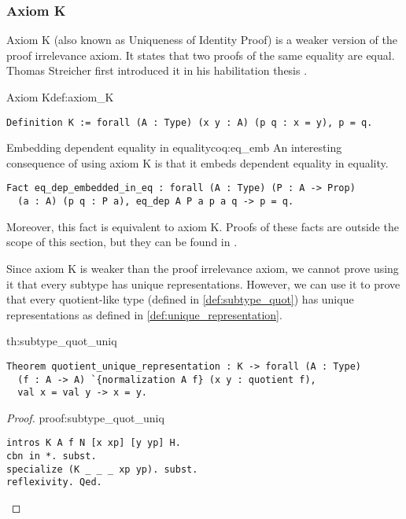 \subsubsection{Axiom K}
Axiom K (also known as Uniqueness of Identity Proof) is a weaker version of the proof irrelevance axiom. It states that two proofs of the same equality are equal. Thomas Streicher first introduced it in his habilitation thesis \cite{Streicher}.
\begin{defi}{Axiom K}{def:axiom_K}
\begin{verbatim}
Definition K := forall (A : Type) (x y : A) (p q : x = y), p = q.
\end{verbatim}
\end{defi}
\begin{coq}{Embedding dependent equality in equality}{coq:eq_emb}
An interesting consequence of using axiom K is that it embeds dependent equality in equality.
\begin{verbatim}
Fact eq_dep_embedded_in_eq : forall (A : Type) (P : A -> Prop)
  (a : A) (p q : P a), eq_dep A P a p a q -> p = q.
\end{verbatim}
Moreover, this fact is equivalent to axiom K. Proofs of these facts are outside the scope of this section, but they can be found in .
\end{coq}
Since axiom K is weaker than the proof irrelevance axiom, we cannot prove using it that every subtype has unique representations. However, we can use it to prove that every quotient-like type (defined in \ref{def:subtype_quot}) has unique representations as defined in \ref{def:unique_representation}.
\begin{theo}{}{th:subtype_quot_uniq}
\begin{verbatim}
Theorem quotient_unique_representation : K -> forall (A : Type) 
  (f : A -> A) `{normalization A f} (x y : quotient f),
  val x = val y -> x = y.
\end{verbatim}
\end{theo}
\begin{proof}{}{proof:subtype_quot_uniq}
\begin{verbatim}
intros K A f N [x xp] [y yp] H. 
cbn in *. subst. 
specialize (K _ _ _ xp yp). subst. 
reflexivity. Qed.
\end{verbatim}
\end{proof}
